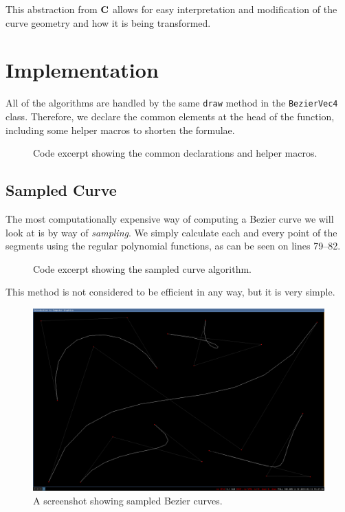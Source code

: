 \documentclass[11pt]{article}
\newcommand{\code}[1]{{\tt #1}}
\newcommand{\mat}[1]{\text{\bf #1}}
\newcommand{\codefig}[5]
{
\begin{figure}[H]
    
    \caption{#5}
    \label{code:#1}
\end{figure}
}
\begin{document}
This abstraction from $\mat{C}$ allows for easy interpretation and
modification of the curve geometry and how it is being transformed.

\newpage
\section{Implementation}
All of the algorithms are handled by the same \code{draw} method in the
\code{BezierVec4} class. Therefore, we declare the common elements at the head
of the function, including some helper macros to shorten the formulae.

\codefig{sampled}{BezierVec4.cpp}{60}{68}
{Code excerpt showing the common declarations and helper macros.}

\subsection{Sampled Curve}
The most computationally expensive way of computing a Bezier curve we will
look at is by way of {\it sampling}. We simply calculate each and every point
of the segments using the regular polynomial functions, as can be seen on
lines 79--82.

\codefig{sampled}{BezierVec4.cpp}{77}{89}
{Code excerpt showing the sampled curve algorithm.}

This method is not considered to be efficient in any way, but it is very
simple.

\begin{figure}[H]
    \center
    \includegraphics[scale=0.25]{figures/test-sampled.png}
    \caption{A screenshot showing sampled Bezier curves.}
    \label{fig:test-sampled}
\end{figure}
\end{document}
